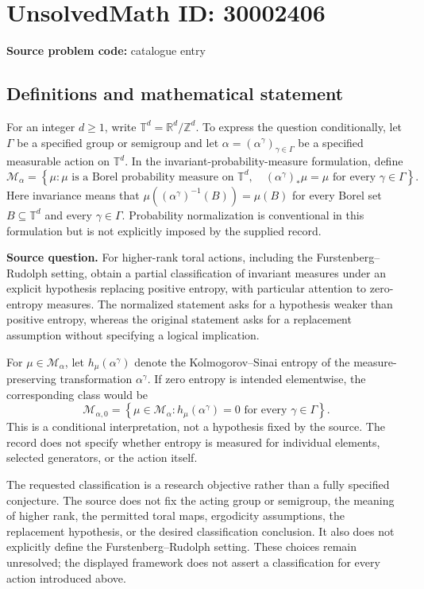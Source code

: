 \documentclass[11pt]{article}
\begin{document}
\section*{UnsolvedMath ID: 30002406}
\textbf{Source problem code:} catalogue entry
\subsection{Definitions and mathematical statement}
For an integer \(d\geq 1\), write \(\mathbb{T}^{d}=\mathbb{R}^{d}/\mathbb{Z}^{d}\). To express the question conditionally, let \(\Gamma\) be a specified group or semigroup and let \(\alpha=(\alpha^\gamma)_{\gamma\in\Gamma}\) be a specified measurable action on \(\mathbb{T}^{d}\). In the invariant-probability-measure formulation, define
\[
\mathcal{M}_{\alpha}=\left\{\mu:\mu\text{ is a Borel probability measure on }\mathbb{T}^{d},\quad (\alpha^\gamma)_*\mu=\mu\text{ for every }\gamma\in\Gamma\right\}.
\]
Here invariance means that \(\mu((\alpha^\gamma)^{-1}(B))=\mu(B)\) for every Borel set \(B\subseteq\mathbb{T}^{d}\) and every \(\gamma\in\Gamma\). Probability normalization is conventional in this formulation but is not explicitly imposed by the supplied record.

\textbf{Source question.} For higher-rank toral actions, including the Furstenberg--Rudolph setting, obtain a partial classification of invariant measures under an explicit hypothesis replacing positive entropy, with particular attention to zero-entropy measures. The normalized statement asks for a hypothesis weaker than positive entropy, whereas the original statement asks for a replacement assumption without specifying a logical implication.

For \(\mu\in\mathcal{M}_{\alpha}\), let \(h_\mu(\alpha^\gamma)\) denote the Kolmogorov--Sinai entropy of the measure-preserving transformation \(\alpha^\gamma\). If zero entropy is intended elementwise, the corresponding class would be
\[
\mathcal{M}_{\alpha,0}=\left\{\mu\in\mathcal{M}_{\alpha}:h_\mu(\alpha^\gamma)=0\text{ for every }\gamma\in\Gamma\right\}.
\]
This is a conditional interpretation, not a hypothesis fixed by the source. The record does not specify whether entropy is measured for individual elements, selected generators, or the action itself.

The requested classification is a research objective rather than a fully specified conjecture. The source does not fix the acting group or semigroup, the meaning of higher rank, the permitted toral maps, ergodicity assumptions, the replacement hypothesis, or the desired classification conclusion. It also does not explicitly define the Furstenberg--Rudolph setting. These choices remain unresolved; the displayed framework does not assert a classification for every action introduced above.
\end{document}
